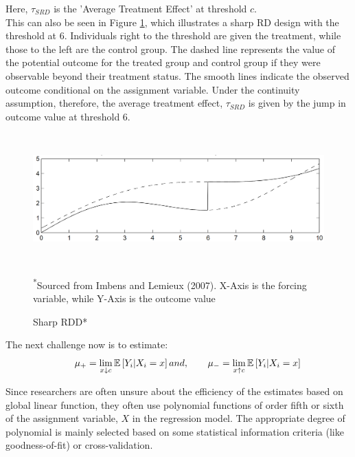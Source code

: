 \documentclass[fleqn]{article}
\begin{document}
    Here, $\tau_{SRD}$ is the 'Average Treatment Effect' at threshold $c$.\\

    This can also be seen in Figure \ref{fig:sharp_rdd}, which illustrates a sharp RD design with the threshold at $6$. Individuals right to the threshold are given the treatment, while those to the left are the control group. The dashed line represents the value of the potential outcome for the treated group and control group if they were observable beyond their treatment status. The smooth lines indicate the observed outcome conditional on the assignment variable. Under the continuity assumption, therefore, the average treatment effect, $\tau_{SRD}$ is given by the jump in outcome value at threshold $6$.  \\

    \begin{figure}[h]
        \centering
        \includegraphics[width = 15cm,height = 5cm]{Intro Sharp RDD.png}
        \caption{Sharp RDD*}
        \small\textsuperscript{*}Sourced from Imbens and Lemieux (2007)\cite{imbens2008regression}. X-Axis is the forcing variable, while Y-Axis is the outcome value 
        \label{fig:sharp_rdd}
    \end{figure}

    The next challenge now is to estimate: \\
    \begin{equation*}
        \qquad \mu_{+} = \lim_{x\downarrow c} \mathbb{E}\left[Y_{i} | X_{i}=x\right] \\and,
        \qquad \mu_{-} = \lim_{x\uparrow c} \mathbb{E}\left[Y_{i} | X_{i}=x\right]
    \end{equation*}

    Since researchers are often unsure about the efficiency of the estimates based on global linear function\cite{gelman2019high}, they often use polynomial functions of order fifth or sixth of the assignment variable, $X$ in the regression model. The appropriate degree of polynomial is mainly selected based on some statistical information criteria (like goodness-of-fit) or cross-validation.\\
    
\end{document}
